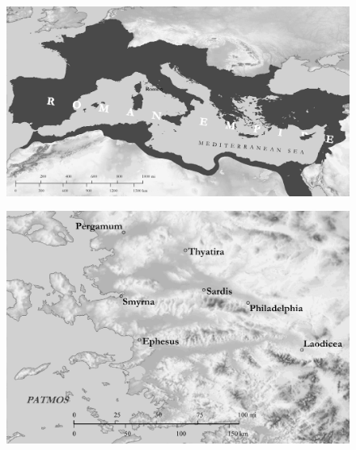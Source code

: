 \cleartoverso
\pagestyle{plain}

\begin{figure}
    \centering
    \includegraphics[width=\paperwidth,height=0.9\paperheight,keepaspectratio]{images/romanempire_bw.jpg}
\end{figure}

\begin{figure}
    \centering
    \includegraphics[width=\paperwidth,height=0.9\paperheight,keepaspectratio]{images/sevenchurches_bw.jpg}
\end{figure}